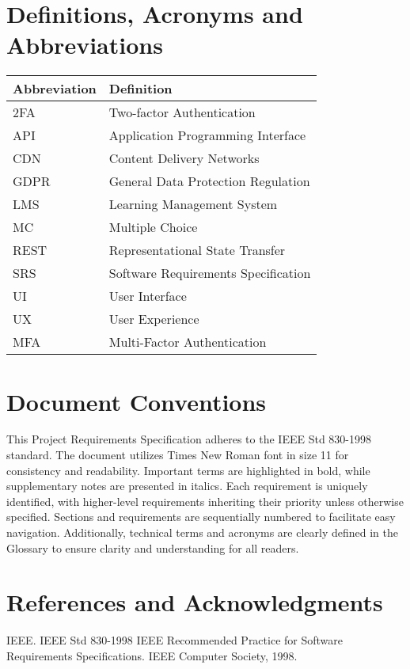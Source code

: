 \documentclass[a4paper, 11pt]{scrreprt}
\begin{document}
\section{Definitions, Acronyms and Abbreviations}
\begin{center}
    \begin{tabularx}{\textwidth}{lX}
        \toprule
        \textbf{Abbreviation} & \textbf{Definition} \\
        \midrule
        2FA & Two-factor Authentication \\
        API & Application Programming Interface \\
        CDN & Content Delivery Networks \\
        GDPR & General Data Protection Regulation \\
        LMS & Learning Management System \\
        MC & Multiple Choice \\
        REST & Representational State Transfer \\
        SRS & Software Requirements Specification \\
        UI & User Interface \\
        UX & User Experience \\
        MFA & Multi-Factor Authentication \\
        \bottomrule
    \end{tabularx}
\end{center}

\section{Document Conventions}
This Project Requirements Specification adheres to the IEEE Std 830-1998 standard. The document utilizes Times New Roman font in size 11 for consistency and readability. Important terms are highlighted in bold, while supplementary notes are presented in italics. Each requirement is uniquely identified, with higher-level requirements inheriting their priority unless otherwise specified. Sections and requirements are sequentially numbered to facilitate easy navigation. Additionally, technical terms and acronyms are clearly defined in the Glossary to ensure clarity and understanding for all readers.

\section{References and Acknowledgments}
IEEE. IEEE Std 830-1998 IEEE Recommended Practice for Software Requirements Specifications. IEEE Computer Society, 1998.
\end{document}
